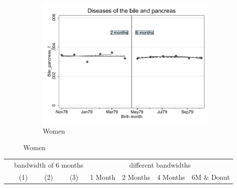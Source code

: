 \documentclass[a4paper ]{article}
\begin{document}
\begin{figure}[h]
\begin{subfigure}[t]{0.31\textwidth}
		\centering
		\includegraphics[width=0.99\textwidth]{R1_RD_Bile_pancreas_f_fits}
		\caption{Women}
	\end{subfigure}
\end{figure}


\begin{table}[h]\centering
\def\sym#1{\ifmmode^{#1}\else\(^{#1}\)\fi}
\begin{tabular}{l*{3}{c}|cccc}
\toprule
&\multicolumn{3}{c}{bandwidth of 6 months} & \multicolumn{4}{c}{different bandwidths} \\
 \cmidrule(lr{1em}){2-4} \cmidrule(lr{1em}){5-8}
 &\multicolumn{1}{c}{(1)}&\multicolumn{1}{c}{(2)}&\multicolumn{1}{c}{(3)}& 1 Month & 2 Months & 4 Months & 6M \& Donut \\
\midrule 

\bottomrule
\end{tabular}
\end{table}
\end{document}
